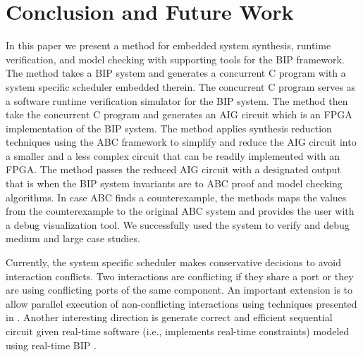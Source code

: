 \section{Conclusion and Future Work}
\label{sec:conclusion}

In this paper we present a method for embedded system synthesis, runtime verification,
and model checking with supporting tools for the BIP framework. 
The method takes a BIP system and generates a concurrent C program with a system 
specific scheduler embedded therein. 
The concurrent C program serves as a software runtime verification simulator for the 
BIP system.
The method then take the concurrent C program and generates an AIG circuit which is an
FPGA implementation of the BIP system. 
The method applies synthesis reduction techniques using the ABC framework 
to simplify and reduce the AIG circuit
into a smaller and a less complex circuit that can be readily implemented with an 
FPGA. 
The method passes the reduced AIG circuit with a designated output that is \true
when the BIP system invariants are \true to ABC proof and model checking 
algorithms. In case ABC finds a counterexample, the methods maps the values from 
the counterexample to the original ABC system and provides the user with a debug
visualization tool. 
We successfully used the system to verify and debug medium and large case studies. 


Currently, the system specific scheduler makes conservative decisions to avoid interaction conflicts. Two interactions are conflicting if they share a port or they are using conflicting ports of the same component. An important extension is to allow parallel execution of non-conflicting interactions using techniques presented in \cite{BonakdarpourBJQS12}. Another interesting direction is generate correct and efficient sequential circuit given real-time software (i.e., implements real-time constraints) modeled using real-time BIP \cite{AbdellatifCS13}. 

